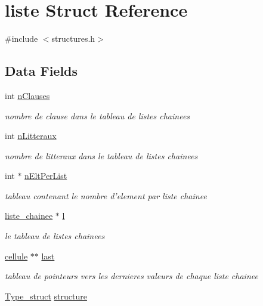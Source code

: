 \hypertarget{structliste}{\section{liste Struct Reference}
\label{structliste}
}


{\ttfamily \#include $<$structures.\-h$>$}

\subsection*{Data Fields}
\begin{DoxyCompactItemize}
\item 
int \hyperlink{structliste_a558c751995cc8454977646fe8d24a76a}{n\-Clauses}
\begin{DoxyCompactList}\small\item\em nombre de clause dans le tableau de listes chainees \end{DoxyCompactList}\item 
int \hyperlink{structliste_aed14ae4c104373df7b9ec2d06aa88f8f}{n\-Litteraux}
\begin{DoxyCompactList}\small\item\em nombre de litteraux dans le tableau de listes chainees \end{DoxyCompactList}\item 
int $\ast$ \hyperlink{structliste_ada6bed3b1b837bfaabd9f323ee011cda}{n\-Elt\-Per\-List}
\begin{DoxyCompactList}\small\item\em tableau contenant le nombre d'element par liste chainee \end{DoxyCompactList}\item 
\hyperlink{structures_8h_aaf182655d57fb1d42731fd86cbed9750}{liste\-\_\-chainee} $\ast$ \hyperlink{structliste_a6b2c4c7aa0493f3349f113ca8c1568de}{l}
\begin{DoxyCompactList}\small\item\em le tableau de listes chainees \end{DoxyCompactList}\item 
\hyperlink{structcellule}{cellule} $\ast$$\ast$ \hyperlink{structliste_ae483f1d1b19346e2a37a180bcb512c08}{last}
\begin{DoxyCompactList}\small\item\em tableau de pointeurs vers les dernieres valeurs de chaque liste chainee \end{DoxyCompactList}\item 
\hyperlink{const_8h_a9e8f293c8dba91894f02b9fe09ca2d06}{Type\-\_\-struct} \hyperlink{structliste_ae8dc45b36e2c6c8df319517f1d0d45d4}{structure}
\end{DoxyCompactItemize}


